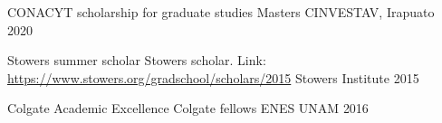 



\begin{cvhonors}

  \cvhonor
    {CONACYT scholarship for graduate studies} %
    {Masters} %
    {CINVESTAV, Irapuato} %
    {2020} %

\end{cvhonors}




\begin{cvhonors}


  \cvhonor
    {Stowers summer scholar} %
    {Stowers scholar. Link:
    \url{https://www.stowers.org/gradschool/scholars/2015}} %
    {Stowers Institute} %
    {2015} %

  \cvhonor
    {Colgate Academic Excellence} %
    {Colgate fellows} %
    {ENES UNAM} %
    {2016} %

\end{cvhonors}
